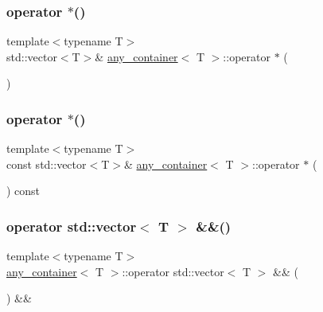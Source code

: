 \subsubsection{\texorpdfstring{operator $\ast$()}{operator *()}\hspace{0.1cm}{\footnotesize\ttfamily [1/2]}}
{\footnotesize\ttfamily template$<$typename T$>$ \\
std\+::vector$<$T$>$\& \mbox{\hyperlink{classany__container}{any\+\_\+container}}$<$ T $>$\+::operator $\ast$ (\begin{DoxyParamCaption}{ }\end{DoxyParamCaption})\hspace{0.3cm}{\ttfamily [inline]}}

\mbox{\label{classany__container_ab94e9ff5873cb2551b5e1a00fa8dc3cf}} 
\subsubsection{\texorpdfstring{operator $\ast$()}{operator *()}\hspace{0.1cm}{\footnotesize\ttfamily [2/2]}}
{\footnotesize\ttfamily template$<$typename T$>$ \\
const std\+::vector$<$T$>$\& \mbox{\hyperlink{classany__container}{any\+\_\+container}}$<$ T $>$\+::operator $\ast$ (\begin{DoxyParamCaption}{ }\end{DoxyParamCaption}) const\hspace{0.3cm}{\ttfamily [inline]}}

\mbox{\label{classany__container_afd688b631f9201494f55e82e6ff4b099}} 
\subsubsection{\texorpdfstring{operator std::vector$<$ T $>$ \&\&()}{operator std::vector< T > \&\&()}}
{\footnotesize\ttfamily template$<$typename T$>$ \\
\mbox{\hyperlink{classany__container}{any\+\_\+container}}$<$ T $>$\+::operator std\+::vector$<$ T $>$ \&\& (\begin{DoxyParamCaption}{ }\end{DoxyParamCaption}) \&\&\hspace{0.3cm}{\ttfamily [inline]}}

